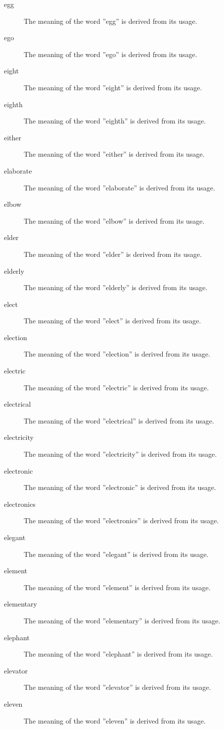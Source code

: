 \documentclass[12pt, letterpaper]{memoir}
\begin{document}
\begin{description}
\item[egg] The meaning of the word ''egg'' is derived from its usage.
\item[ego] The meaning of the word ''ego'' is derived from its usage.
\item[eight] The meaning of the word ''eight'' is derived from its usage.
\item[eighth] The meaning of the word ''eighth'' is derived from its usage.
\item[either] The meaning of the word ''either'' is derived from its usage.
\item[elaborate] The meaning of the word ''elaborate'' is derived from its usage.
\item[elbow] The meaning of the word ''elbow'' is derived from its usage.
\item[elder] The meaning of the word ''elder'' is derived from its usage.
\item[elderly] The meaning of the word ''elderly'' is derived from its usage.
\item[elect] The meaning of the word ''elect'' is derived from its usage.
\item[election] The meaning of the word ''election'' is derived from its usage.
\item[electric] The meaning of the word ''electric'' is derived from its usage.
\item[electrical] The meaning of the word ''electrical'' is derived from its usage.
\item[electricity] The meaning of the word ''electricity'' is derived from its usage.
\item[electronic] The meaning of the word ''electronic'' is derived from its usage.
\item[electronics] The meaning of the word ''electronics'' is derived from its usage.
\item[elegant] The meaning of the word ''elegant'' is derived from its usage.
\item[element] The meaning of the word ''element'' is derived from its usage.
\item[elementary] The meaning of the word ''elementary'' is derived from its usage.
\item[elephant] The meaning of the word ''elephant'' is derived from its usage.
\item[elevator] The meaning of the word ''elevator'' is derived from its usage.
\item[eleven] The meaning of the word ''eleven'' is derived from its usage.

\end{description}
\end{document}
